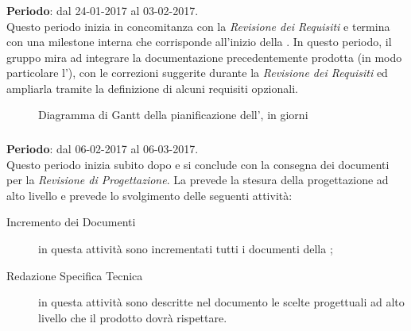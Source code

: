 	\subsubsection{\ARI} \label{sec:ARI}
	\textbf{Periodo}: dal 24-01-2017 al 03-02-2017.
	\\ Questo periodo inizia in concomitanza con la \emph{Revisione dei Requisiti} e termina con una milestone interna che corrisponde all'inizio della \PA. In questo periodo, il gruppo mira ad integrare la documentazione precedentemente prodotta (in modo particolare l'\AR), con le correzioni suggerite durante la \emph{Revisione dei Requisiti} ed ampliarla tramite la definizione di alcuni requisiti opzionali.



\begin{figure}[H]
\label{tab:genweeks}
\caption{Diagramma di Gantt della pianificazione dell'\ARI, in giorni}
\end{figure}

	
	\subsubsection{\PA} \label{sec:PA}
	\textbf{Periodo}: dal 06-02-2017 al 06-03-2017.	
	\\ Questo periodo inizia subito dopo \ARI{} e si conclude con la consegna dei documenti per la \emph{Revisione di Progettazione}. La \PA{} prevede la stesura della progettazione ad alto livello e prevede lo svolgimento delle seguenti attività:
	\begin{description}
		\item[Incremento dei Documenti] in questa attività sono incrementati tutti i documenti della \PA{};
		\item[Redazione Specifica Tecnica] in questa attività sono descritte nel documento le scelte progettuali ad alto livello che il prodotto dovrà rispettare.
	\end{description}
	

